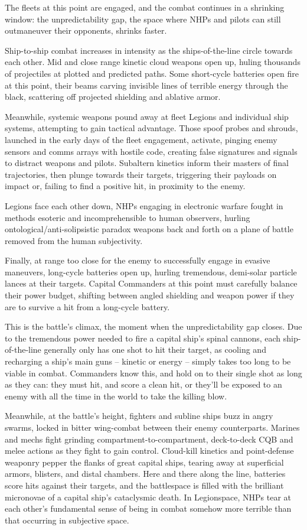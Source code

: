 The fleets at this point are engaged, and the combat continues in a shrinking window: the
unpredictability gap, the space where NHPs and pilots can still outmaneuver their opponents,
shrinks faster.

Ship-to-ship combat increases in intensity as the ships-of-the-line circle towards each other. Mid
and close range kinetic cloud weapons open up, huling thousands of projectiles at plotted and
predicted paths. Some short-cycle batteries open fire at this point, their beams carving invisible
lines of terrible energy through the black, scattering off projected shielding and ablative armor.

Meanwhile, systemic weapons pound away at fleet Legions and individual ship systems,
attempting to gain tactical advantage. Those spoof probes and shrouds, launched in the early
days of the fleet engagement, activate, pinging enemy sensors and comms arrays with hostile
code, creating false signatures and signals to distract weapons and pilots. Subaltern kinetics
inform their masters of final trajectories, then plunge towards their targets, triggering their
payloads on impact or, failing to find a positive hit, in proximity to the enemy.

Legions face each other down, NHPs engaging in electronic warfare fought in methods esoteric
and incomprehensible to human observers, hurling ontological/anti-solipsistic paradox weapons
back and forth on a plane of battle removed from the human subjectivity.

Finally, at range too close for the enemy to successfully engage in evasive maneuvers, long-cycle
batteries open up, hurling tremendous, demi-solar particle lances at their targets. Capital
Commanders at this point must carefully balance their power budget, shifting between angled
shielding and weapon power if they are to survive a hit from a long-cycle battery.

This is the battle's climax, the moment when the unpredictability gap closes. Due to the
tremendous power needed to fire a capital ship's spinal cannons, each ship-of-the-line generally
only has one shot to hit their target, as cooling and recharging a ship's main guns -- kinetic or
energy -- simply takes too long to be viable in combat. Commanders know this, and hold on to
their single shot as long as they can: they must hit, and score a clean hit, or they'll be exposed to
an enemy with all the time in the world to take the killing blow.

Meanwhile, at the battle's height, fighters and subline ships buzz in angry swarms, locked in
bitter wing-combat between their enemy counterparts. Marines and mechs fight grinding
compartment-to-compartment, deck-to-deck CQB and melee actions as they fight to gain
control. Cloud-kill kinetics and point-defense weaponry pepper the flanks of great capital ships,
tearing away at superficial armors, blisters, and distal chambers. Here and there along the line,
batteries score hits against their targets, and the battlespace is filled with the brilliant micronovae
of a capital ship's cataclysmic death. In Legionspace, NHPs tear at each other's fundamental
sense of being in combat somehow more terrible than that occurring in subjective space.

